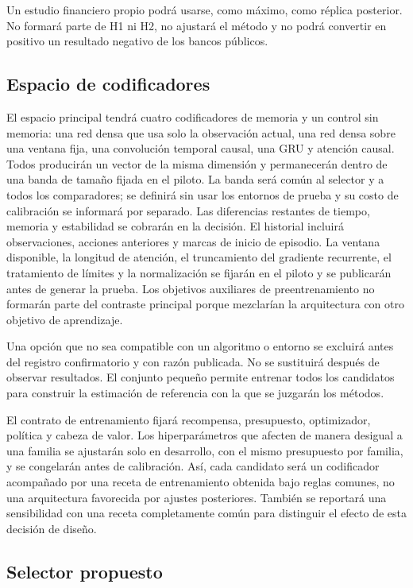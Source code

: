 \documentclass[11pt,letterpaper]{article}
\begin{document}
Un estudio financiero propio podrá usarse, como máximo, como réplica posterior.
No formará parte de H1 ni H2, no ajustará el método y no podrá convertir en positivo un resultado negativo de los bancos públicos.

\subsection{Espacio de codificadores}

El espacio principal tendrá cuatro codificadores de memoria y un control sin memoria: una red densa que usa solo la observación actual, una red densa sobre una ventana fija, una convolución temporal causal, una GRU y atención causal.
Todos producirán un vector de la misma dimensión y permanecerán dentro de una banda de tamaño fijada en el piloto.
La banda será común al selector y a todos los comparadores; se definirá sin usar los entornos de prueba y su costo de calibración se informará por separado.
Las diferencias restantes de tiempo, memoria y estabilidad se cobrarán en la decisión.
El historial incluirá observaciones, acciones anteriores y marcas de inicio de episodio.
La ventana disponible, la longitud de atención, el truncamiento del gradiente recurrente, el tratamiento de límites y la normalización se fijarán en el piloto y se publicarán antes de generar la prueba.
Los objetivos auxiliares de preentrenamiento no formarán parte del contraste principal porque mezclarían la arquitectura con otro objetivo de aprendizaje.

Una opción que no sea compatible con un algoritmo o entorno se excluirá antes del registro confirmatorio y con razón publicada.
No se sustituirá después de observar resultados.
El conjunto pequeño permite entrenar todos los candidatos para construir la estimación de referencia con la que se juzgarán los métodos.

El contrato de entrenamiento fijará recompensa, presupuesto, optimizador, política y cabeza de valor.
Los hiperparámetros que afecten de manera desigual a una familia se ajustarán solo en desarrollo, con el mismo presupuesto por familia, y se congelarán antes de calibración.
Así, cada candidato será un codificador acompañado por una receta de entrenamiento obtenida bajo reglas comunes, no una arquitectura favorecida por ajustes posteriores.
También se reportará una sensibilidad con una receta completamente común para distinguir el efecto de esta decisión de diseño.

\subsection{Selector propuesto}
\end{document}
